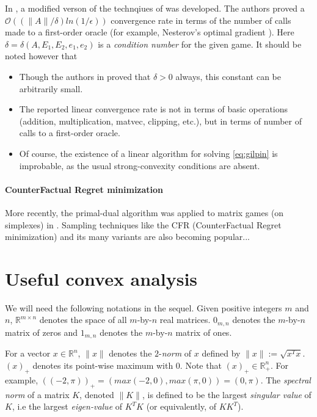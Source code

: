 \documentclass{article} %
\begin{document}
In \cite{gilpinfirst}, a modified verson of the technqiues of \cite{hoda2010smoothing} was developed. The authors proved a $\mathcal{O}\left(\left(\|A\| / \delta\right) ln\left(1 / \epsilon\right)\right)$ convergence rate in terms of the number of calls made to a first-order oracle (for example, Nesterov's optimal gradient \cite{nesterov1983}). Here $\delta = \delta(A, E_1, E_2, e_1, e_2)$ is a \textit{condition number} for the given game.
It should be noted however that
\begin{itemize}
\item Though the authors in \cite{gilpinfirst} proved that $\delta > 0$ always, this constant can be arbitrarily small.\item The reported linear convergence rate is not in terms of basic operations (addition, multiplication, matvec, clipping, etc.), but in terms of number of calls to a first-order oracle. %
  \item Of course, the existence of a linear algorithm for solving \eqref{eq:gilpin} is improbable, as the usual strong-convexity conditions are absent.
\end{itemize}

\paragraph{CounterFactual Regret minimization}
More recently, the primal-dual algorithm was applied to matrix games (on simplexes) in \cite{chambolle2014ergodic}. Sampling techniques like the CFR (CounterFactual Regret minimization) and its many variants \cite{MartinZinkevichNIPS2007, lanctot2009monte} are also becoming popular...

\section{Useful convex analysis}
\label{sec:notation}
We will need the following notations in the sequel. Given positive integers $m$ and $n$, $\mathbb{R}^{m \times n}$ denotes
the space of all $m$-by-$n$ real matrices. $0_{m,n}$ denotes the $m$-by-$n$ matrix of zeros and $1_{m,n}$ denotes the $m$-by-$n$ matrix of ones.

For a vector $x \in \mathbb{R}^n$, $\|x\|$ denotes the $2$-\textit{norm} of $x$ defined by $\|x\| := \sqrt{x^Tx}$.
$(x)_+$ denotes its point-wise maximum with 0. Note that $(x)_+ \in \mathbb{R}^n_+$.
For example, $((-2, \pi))_+ = (max(-2, 0), max(\pi, 0)) = (0, \pi)$. The \textit{spectral norm} of a matrix $K$,
denoted $\|K\|$, is defined to be the largest \textit{singular value} of $K$, i.e the largest \textit{eigen-value} of $K^TK$ (or equivalently, of $KK^T$).
\end{document}
